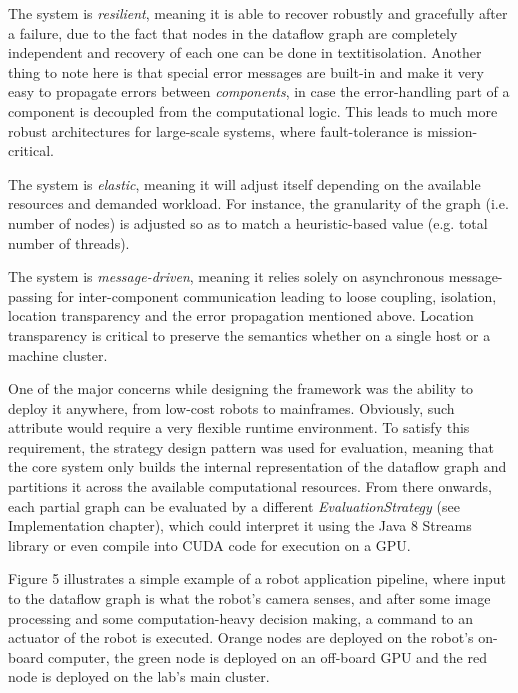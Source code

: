 \documentclass{dithesis}
\begin{document}
The system is \textit{resilient}, meaning it is able to recover robustly and gracefully after a failure, due to the fact that nodes in the dataflow graph are completely independent and recovery of each one can be done in textit{isolation}. Another thing to note here is that special error messages are built-in and make it very easy to propagate errors between \textit{components}, in case the error-handling part of a component is decoupled from the computational logic. This leads to much more robust architectures for large-scale systems, where fault-tolerance is mission-critical.

The system is \textit{elastic}, meaning it will adjust itself depending on the available resources and demanded workload. For instance, the granularity of the graph (i.e. number of nodes) is adjusted so as to match a heuristic-based value (e.g. total number of threads).

The system is \textit{message-driven}, meaning it relies solely on asynchronous message-passing for inter-component communication leading to loose coupling, isolation, location transparency and the error propagation mentioned above. Location transparency is critical to preserve the semantics whether on a single host or a machine cluster. 



One of the major concerns while designing the framework was the ability to deploy it anywhere, from low-cost robots to mainframes. Obviously, such attribute would require a very flexible runtime environment. To satisfy this requirement, the strategy design pattern was used for evaluation, meaning that the core system only builds the internal representation of the dataflow graph and partitions it across the available computational resources. From there onwards, each partial graph can be evaluated by a different \textit{EvaluationStrategy} (see Implementation chapter), which could interpret it using the Java 8 Streams library or even compile into CUDA code for execution on a GPU.

Figure 5 illustrates a simple example of a robot application pipeline, where input to the dataflow graph is what the robot's camera senses, and after some image processing and some computation-heavy decision making, a command to an actuator of the robot is executed. Orange nodes are deployed on the robot's on-board computer, the green node is deployed on an off-board GPU and the red node is deployed on the lab's main cluster.
\end{document}
